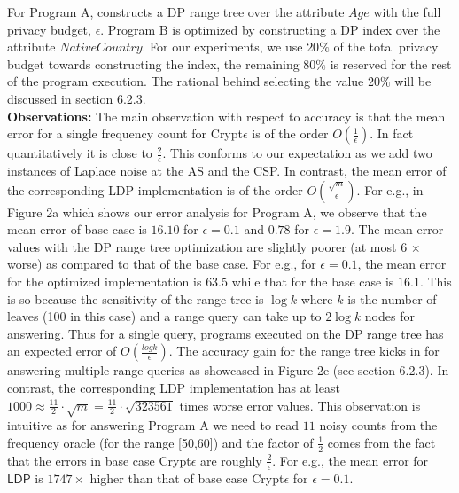 For Program A, \system constructs a DP range tree over the attribute $Age$ with the full privacy budget, $\epsilon$. Program B is optimized by constructing a DP index over the attribute $NativeCountry$. For our experiments, we use $20\%$ of the total privacy budget towards constructing the index, the remaining $80\%$ is reserved for the rest of the program execution. The rational behind selecting the value $20\%$ will be discussed in section 6.2.3.\\
\textbf{Observations:} The main observation with respect to accuracy is that the mean error for a single frequency count for Crypt$\epsilon$ is of the order $O(\frac{1}{\epsilon})$. In fact quantitatively it is close to $\frac{2}{\epsilon}$. This conforms to our expectation as we add two instances of Laplace noise at the \textsf{AS} and the \textsf{CSP}.  In contrast, the mean error of the corresponding \textsf{LDP} implementation is of the order $O(\frac{\sqrt{m}}{\epsilon})$. For e.g., in Figure 2a which shows our error analysis for Program A, we observe that the mean error of base case \system is $16.10$ for $\epsilon=0.1$ and $0.78$ for $\epsilon=1.9$. The mean error values with the DP range tree optimization are slightly poorer (at most 6 $\times$ worse)  as compared to that of the base case. For e.g., for $\epsilon=0.1$, the mean error for the optimized implementation is $63.5$ while that for the base case is $16.1$. This is so because the sensitivity of the range tree is $\log k$ where $k$ is the number of leaves (100 in this case) and a range query can take up to $2 \log k$ nodes for answering. Thus for a single query, programs executed on the DP range tree has an expected error of $O(\frac{logk}{\epsilon})$. The accuracy gain for the range tree kicks in for answering multiple range queries as showcased in Figure 2e (see section 6.2.3).  In contrast, the corresponding \textsf{LDP} implementation has at least $1000 \approx \frac{11}{2}\cdot \sqrt{m}=  \frac{11}{2}\cdot \sqrt{323561}$ times worse error values.  This observation is intuitive as for answering Program A we need to read $11$ noisy counts from the frequency oracle (for the range [50,60]) and the factor of $\frac{1}{2}$ comes from the fact that the errors in base case Crypt$\epsilon$ are roughly $\frac{2}{\epsilon}$. For e.g., the mean error for $\textsf{LDP}$ is $1747 \times$  higher than that of base case Crypt$\epsilon$ for $\epsilon=0.1$. 


